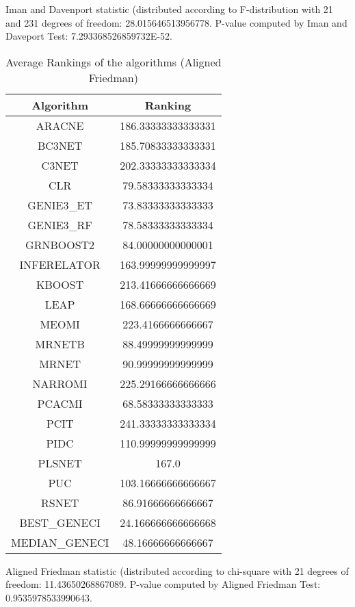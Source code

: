 \documentclass[a4paper,10pt]{article}
\begin{document}
\begin{landscape}
Iman and Davenport statistic (distributed according to F-distribution with 21 and 231 degrees of freedom: 28.015646513956778. 
P-value computed by Iman and Daveport Test: 7.293368526859732E-52.\newline


\newpage

\begin{table}[!htp]
\centering
\caption{Average Rankings of the algorithms (Aligned Friedman)
}\begin{tabular}{c|c}
Algorithm&Ranking\\
\hline
ARACNE&186.33333333333331\\
BC3NET&185.70833333333331\\
C3NET&202.33333333333334\\
CLR&79.58333333333334\\
GENIE3_ET&73.83333333333333\\
GENIE3_RF&78.58333333333334\\
GRNBOOST2&84.00000000000001\\
INFERELATOR&163.99999999999997\\
KBOOST&213.41666666666669\\
LEAP&168.66666666666669\\
MEOMI&223.4166666666667\\
MRNETB&88.49999999999999\\
MRNET&90.99999999999999\\
NARROMI&225.29166666666666\\
PCACMI&68.58333333333333\\
PCIT&241.33333333333334\\
PIDC&110.99999999999999\\
PLSNET&167.0\\
PUC&103.16666666666667\\
RSNET&86.91666666666667\\
BEST_GENECI&24.166666666666668\\
MEDIAN_GENECI&48.16666666666667\\
\end{tabular}
\end{table}


Aligned Friedman statistic (distributed according to chi-square with 21 degrees of freedom: 11.43650268867089. 
P-value computed by Aligned Friedman Test: 0.9535978533990643.\newline


\newpage


\end{landscape}
\end{document}
